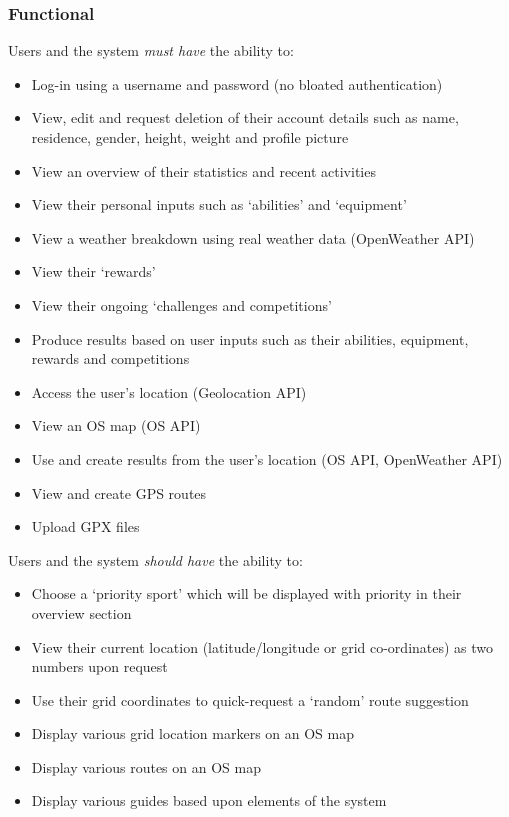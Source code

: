 \documentclass[11pt, english]{article}
\begin{document}
		\subsubsection{Functional}

	Users and the system \textit{must have} the ability to:

	\begin{itemize}
	\setlength\itemsep{0cm}
		\item Log-in using a username and password (no bloated authentication)
		\item View, edit and request deletion of their account details such as name, residence, gender, height, weight and profile picture
		\item View an overview of their statistics and recent activities
		\item View their personal inputs such as `abilities' and `equipment'
		\item View a weather breakdown using real weather data (OpenWeather API)
		\item View their `rewards'
		\item View their ongoing `challenges and competitions'
		\item Produce results based on user inputs such as their abilities, equipment, rewards and competitions
		\item Access the user's location (Geolocation API)
		\item View an OS map (OS API)
		\item Use and create results from the user's location (OS API, OpenWeather API)
		\item View and create GPS routes
		\item Upload GPX files
	\end{itemize}

	Users and the system \textit{should have} the ability to:

	\begin{itemize}
	\setlength\itemsep{0cm}
		\item Choose a `priority sport' which will be displayed with priority in their overview section
		\item View their current location (latitude/longitude or grid co-ordinates) as two numbers upon request
		\item Use their grid coordinates to quick-request a `random' route suggestion
		\item Display various grid location markers on an OS map
		\item Display various routes on an OS map
		\item Display various guides based upon elements of the system
	\end{itemize}
\end{document}
